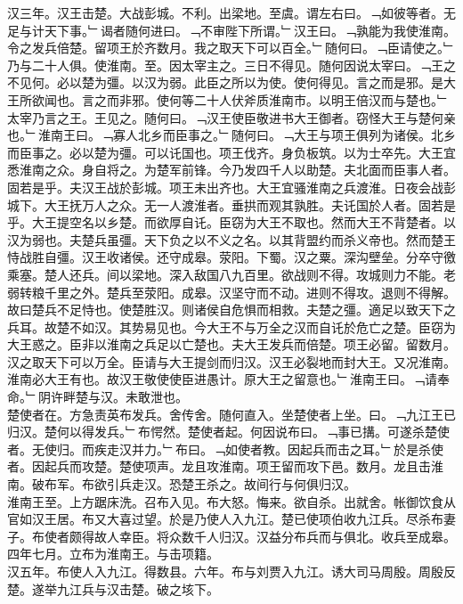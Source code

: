 \documentclass{zhvt-classic}
\begin{document}
\hspace*{2em}汉三年。汉王击楚。大战彭城。不利。出梁地。至虞。谓左右曰。﹁如彼等者。无足与计天下事。﹂谒者随何进曰。﹁不审陛下所谓。﹂汉王曰。﹁孰能为我使淮南。令之发兵倍楚。留项王於齐数月。我之取天下可以百全。﹂随何曰。﹁臣请使之。﹂乃与二十人俱。使淮南。至。因太宰主之。三日不得见。随何因说太宰曰。﹁王之不见何。必以楚为彊。以汉为弱。此臣之所以为使。使何得见。言之而是邪。是大王所欲闻也。言之而非邪。使何等二十人伏斧质淮南市。以明王倍汉而与楚也。﹂太宰乃言之王。王见之。随何曰。﹁汉王使臣敬进书大王御者。窃怪大王与楚何亲也。﹂淮南王曰。﹁寡人北乡而臣事之。﹂随何曰。﹁大王与项王俱列为诸侯。北乡而臣事之。必以楚为彊。可以讬国也。项王伐齐。身负板筑。以为士卒先。大王宜悉淮南之众。身自将之。为楚军前锋。今乃发四千人以助楚。夫北面而臣事人者。固若是乎。夫汉王战於彭城。项王未出齐也。大王宜骚淮南之兵渡淮。日夜会战彭城下。大王抚万人之众。无一人渡淮者。垂拱而观其孰胜。夫讬国於人者。固若是乎。大王提空名以乡楚。而欲厚自讬。臣窃为大王不取也。然而大王不背楚者。以汉为弱也。夫楚兵虽彊。天下负之以不义之名。以其背盟约而杀义帝也。然而楚王恃战胜自彊。汉王收诸侯。还守成皋。荥阳。下蜀。汉之粟。深沟壁垒。分卒守徼乘塞。楚人还兵。间以梁地。深入敌国八九百里。欲战则不得。攻城则力不能。老弱转粮千里之外。楚兵至荥阳。成皋。汉坚守而不动。进则不得攻。退则不得解。故曰楚兵不足恃也。使楚胜汉。则诸侯自危惧而相救。夫楚之彊。適足以致天下之兵耳。故楚不如汉。其势易见也。今大王不与万全之汉而自讬於危亡之楚。臣窃为大王惑之。臣非以淮南之兵足以亡楚也。夫大王发兵而倍楚。项王必留。留数月。汉之取天下可以万全。臣请与大王提剑而归汉。汉王必裂地而封大王。又况淮南。淮南必大王有也。故汉王敬使使臣进愚计。原大王之留意也。﹂淮南王曰。﹁请奉命。﹂阴许畔楚与汉。未敢泄也。\\
\hspace*{2em}楚使者在。方急责英布发兵。舍传舍。随何直入。坐楚使者上坐。曰。﹁九江王已归汉。楚何以得发兵。﹂布愕然。楚使者起。何因说布曰。﹁事已搆。可遂杀楚使者。无使归。而疾走汉并力。﹂布曰。﹁如使者教。因起兵而击之耳。﹂於是杀使者。因起兵而攻楚。楚使项声。龙且攻淮南。项王留而攻下邑。数月。龙且击淮南。破布军。布欲引兵走汉。恐楚王杀之。故间行与何俱归汉。\\
\hspace*{2em}淮南王至。上方踞床洗。召布入见。布大怒。悔来。欲自杀。出就舍。帐御饮食从官如汉王居。布又大喜过望。於是乃使人入九江。楚已使项伯收九江兵。尽杀布妻子。布使者颇得故人幸臣。将众数千人归汉。汉益分布兵而与俱北。收兵至成皋。四年七月。立布为淮南王。与击项籍。\\
\hspace*{2em}汉五年。布使人入九江。得数县。六年。布与刘贾入九江。诱大司马周殷。周殷反楚。遂举九江兵与汉击楚。破之垓下。\\
\end{document}
